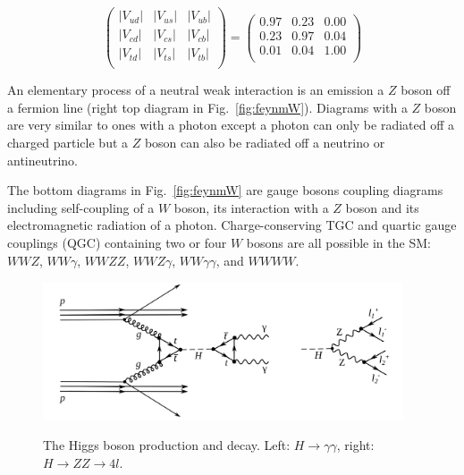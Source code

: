 \begin{equation}\label{eq:CKM_magn}
  \begin{pmatrix} 
     |V_{ud}| & |V_{us}| & |V_{ub}| \\
     |V_{cd}| & |V_{cs}| & |V_{cb}| \\
     |V_{td}| & |V_{ts}| & |V_{tb}| \\ 
  \end{pmatrix}
    =
  \begin{pmatrix} 
     0.97 & 0.23 & 0.00 \\
     0.23 & 0.97 & 0.04 \\
     0.01 & 0.04 & 1.00 \\ 
  \end{pmatrix}
\end{equation}

An elementary process of a neutral weak interaction is an emission a $Z$ boson off a fermion line (right top diagram in Fig.~\ref{fig:feynmW}). Diagrams with a $Z$ boson are very similar to ones with a photon except a photon can only be radiated off a charged particle but a $Z$ boson can also be radiated off a neutrino or antineutrino.

The bottom diagrams in Fig.~\ref{fig:feynmW} are gauge bosons coupling diagrams including self-coupling of a $W$ boson, its interaction with a $Z$ boson and its electromagnetic radiation of a photon. Charge-conserving TGC and quartic gauge couplings (QGC) containing two or four $W$ bosons are all possible in the SM: $WWZ$, $WW\gamma$, $WWZZ$, $WWZ\gamma$, $WW\gamma\gamma$, and $WWWW$.

\begin{figure}[htb]
  \begin{center}
    {\includegraphics[width=0.95\textwidth]{../figs/Intro/FeynmanHiggs.png}}
    \caption{The Higgs boson production and decay. Left: $H\rightarrow\gamma\gamma$, right: $H\rightarrow ZZ \rightarrow 4l$.}
    \label{fig:higgsProduction}
  \end{center}
\end{figure}

